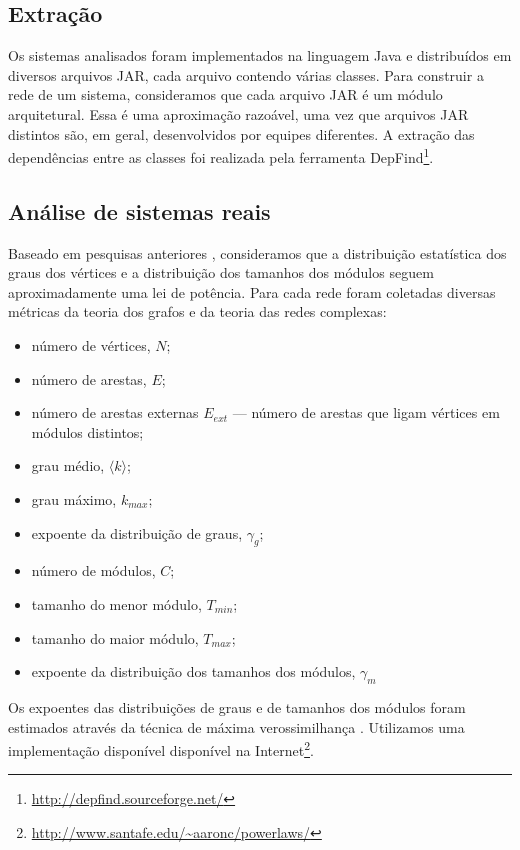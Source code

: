 \documentclass{acm_proc_article-sp}
\begin{document}
\subsection{Extração}

Os sistemas analisados foram implementados na linguagem Java e distribuídos em diversos arquivos JAR, cada arquivo contendo várias classes. Para construir a rede de um sistema, consideramos que cada arquivo JAR é um módulo arquitetural. Essa é uma aproximação razoável, uma vez que arquivos JAR distintos são, em geral, desenvolvidos por equipes diferentes. A extração das dependências entre as classes foi realizada pela ferramenta DepFind\footnote{\url{http://depfind.sourceforge.net/}}.

\subsection{Análise de sistemas reais}

Baseado em pesquisas anteriores \cite{Valverde2003,Myers2003,Baxter2006}, consideramos que a distribuição estatística dos graus dos vértices e a distribuição dos tamanhos dos módulos seguem aproximadamente uma lei de potência. Para cada rede foram coletadas diversas métricas da teoria dos grafos e da teoria das redes complexas:

\begin{itemize}
\item número de vértices, $N$;
\item número de arestas, $E$;
\item número de arestas externas $E_{ext}$ --- número de arestas que ligam vértices em módulos distintos;
\item grau médio, $\langle k \rangle$;
\item grau máximo, $k_{max}$;
\item expoente da distribuição de graus, $\gamma_g$;
\item número de módulos, $C$;
\item tamanho do menor módulo, $T_{min}$;
\item tamanho do maior módulo, $T_{max}$;
\item expoente da distribuição dos tamanhos dos módulos, $\gamma_m$
\end{itemize}

Os expoentes das distribuições de graus e de tamanhos dos módulos foram estimados através da técnica de máxima verossimilhança \cite{Clauset2007}. Utilizamos uma implementação disponível disponível na Internet\footnote{\url{http://www.santafe.edu/~aaronc/powerlaws/}}. 
\end{document}
